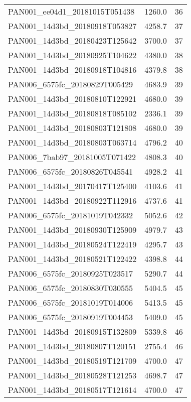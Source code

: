 \begin{tabular}{lrr}
PAN001\_ee04d1\_20181015T051438 &     1260.0 &       36 \\
PAN001\_14d3bd\_20180918T053827 &     4258.7 &       37 \\
PAN001\_14d3bd\_20180423T125642 &     3700.0 &       37 \\
PAN001\_14d3bd\_20180925T104622 &     4380.0 &       38 \\
PAN001\_14d3bd\_20180918T104816 &     4379.8 &       38 \\
PAN006\_6575fc\_20180829T005429 &     4683.9 &       39 \\
PAN001\_14d3bd\_20180810T122921 &     4680.0 &       39 \\
PAN001\_14d3bd\_20180818T085102 &     2336.1 &       39 \\
PAN001\_14d3bd\_20180803T121808 &     4680.0 &       39 \\
PAN001\_14d3bd\_20180803T063714 &     4796.2 &       40 \\
PAN006\_7bab97\_20181005T071422 &     4808.3 &       40 \\
PAN006\_6575fc\_20180826T045541 &     4928.2 &       41 \\
PAN001\_14d3bd\_20170417T125400 &     4103.6 &       41 \\
PAN001\_14d3bd\_20180922T112916 &     4737.6 &       41 \\
PAN006\_6575fc\_20181019T042332 &     5052.6 &       42 \\
PAN001\_14d3bd\_20180930T125909 &     4979.7 &       43 \\
PAN001\_14d3bd\_20180524T122419 &     4295.7 &       43 \\
PAN001\_14d3bd\_20180521T122422 &     4398.8 &       44 \\
PAN006\_6575fc\_20180925T023517 &     5290.7 &       44 \\
PAN006\_6575fc\_20180830T030555 &     5404.5 &       45 \\
PAN006\_6575fc\_20181019T014006 &     5413.5 &       45 \\
PAN006\_6575fc\_20180919T004453 &     5409.0 &       45 \\
PAN001\_14d3bd\_20180915T132809 &     5339.8 &       46 \\
PAN001\_14d3bd\_20180807T120151 &     2755.4 &       46 \\
PAN001\_14d3bd\_20180519T121709 &     4700.0 &       47 \\
PAN001\_14d3bd\_20180528T121253 &     4698.7 &       47 \\
PAN001\_14d3bd\_20180517T121614 &     4700.0 &       47 \\

\end{tabular}
